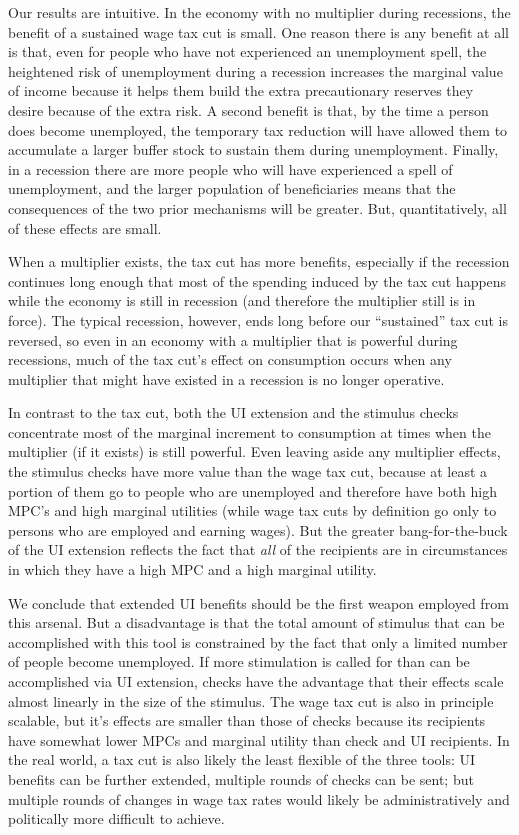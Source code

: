 \documentclass[../HAFiscal]{subfiles}
\begin{document}
Our results are intuitive. In the economy with no multiplier during recessions, the benefit of a sustained wage tax cut is small.  One reason there is any benefit at all is that, even for people who have not experienced an unemployment spell, the heightened risk of unemployment during a recession increases the marginal value of income because it helps them build the extra precautionary reserves they desire because of the extra risk.  A second benefit is that, by the time a person does become unemployed, the temporary tax reduction will have allowed them to accumulate a larger buffer stock to sustain them during unemployment.  Finally, in a recession there are more people who will have experienced a spell of unemployment, and the larger population of beneficiaries means that the consequences of the two prior mechanisms will be greater.  But, quantitatively, all of these effects are small.

When a multiplier exists, the tax cut has more benefits, especially if the recession continues long enough that most of the spending induced by the tax cut happens while the economy is still in recession (and therefore the multiplier still is in force).  The typical recession, however, ends long before our ``sustained'' tax cut is reversed, so even in an economy with a multiplier that is powerful during recessions, much of the tax cut's effect on consumption occurs when any multiplier that might have existed in a recession is no longer operative.

In contrast to the tax cut, both the UI extension and the stimulus checks concentrate most of the marginal increment to consumption at times when the multiplier (if it exists) is still powerful.  Even leaving aside any multiplier effects, the stimulus checks have more value than the wage tax cut, because at least a portion of them go to people who are unemployed and therefore have both high MPC's and high marginal utilities (while wage tax cuts by definition go only to persons who are employed and earning wages).  But the greater bang-for-the-buck of the UI extension reflects the fact that \textit{all} of the recipients are in circumstances in which they have a high MPC and a high marginal utility.

We conclude that extended UI benefits should be the first weapon employed from this arsenal.  But a disadvantage is that the total amount of stimulus that can be accomplished with this tool is constrained by the fact that only a limited number of people become unemployed.  If more stimulation is called for than can be accomplished via UI extension, checks have the advantage that their effects scale almost linearly in the size of the stimulus.  The wage tax cut is also in principle scalable, but it's effects are smaller than those of checks because its recipients have somewhat lower MPCs and marginal utility than check and UI recipients.  In the real world, a tax cut is also likely the least flexible of the three tools:  UI benefits can be further extended, multiple rounds of checks can be sent; but multiple rounds of changes in wage tax rates would likely be administratively and politically more difficult to achieve.
\end{document}
